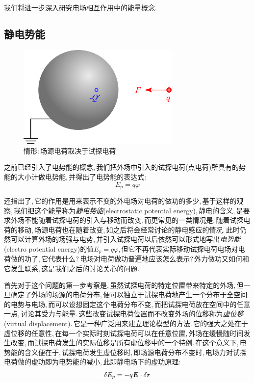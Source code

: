 我们将进一步深入研究电场相互作用中的能量概念.

\subsection{静电势能}

\begin{figure}
\centering
\vspace{-0.1cm}
\includegraphics[width=8cm]{image/7-1-8.png}
\caption{情形:\,场源电荷取决于试探电荷}
\end{figure}
之前已经引入了电势能的概念,\,我们把外场中引入的试探电荷(点电荷)所具有的势能的大小计做电势能,\,并得出了电势能的表达式:
\[E_p=q\varphi\]

还指出了,\,它的作用是用来表示不变的外电场对电荷的做功的多少,\,基于这样的观察,\,我们把这个能量称为\emph{静电势能}(electrostatic potential energy),\,静电的含义,\,是要求外场不能随着试探电荷的引入与移动而改变.\,而更常见的一类情况是,\,随着试探电荷的移动,\,场源电荷也在随着改变,\,如之后将会经常讨论的静电感应的情况.\,此时仍然可以计算外场的场强与电势,\,并引入试探电荷以后依然可以形式地写出\emph{电势能}(electro potential energy)的值$E_p=q\varphi$,\,但它不再代表实际移动试探电荷电场对电荷做的功了,\,它代表什么?\,电场对电荷做功普遍地应该怎么表示?\,外力做功又如何和它发生联系,\,这是我们之后的讨论关心的问题.

首先对于这个问题的第一步考察是,\,虽然试探电荷的特定位置带来特定的外场,\,但一旦确定了外场的场源的电荷分布,\,便可以独立于试探电荷地产生一个分布于全空间的电势与电场,\,而可以设想固定这个电荷分布不变,\,而把试探电荷放在空间中的任意一点,\,讨论其受力与能量.\,这些改变试探电荷位置而不改变外场的位移称为\emph{虚位移}(virtual displacement).\,它是一种广泛用来建立理论模型的方法.\,它的强大之处在于虚位移的任意性,\,在每一个实际时刻试探电荷可以在任意位置,\,外场在缓慢随时间发生改变,\,而试探电荷发生的实际位移是所有虚位移中的一个特例.\,在这个意义下,\,电势能的含义便在于,\,试探电荷发生虚位移时,\,即场源电荷分布不变时,\,电场力对试探电荷做的虚功即为电势能的减小,\,此即静电场下的虚功原理:
\[\delta E_p=-q\boldsymbol{E}\cdot\delta \boldsymbol{r}\]

